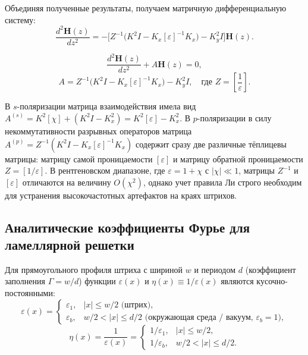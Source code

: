 \documentclass[a4paper,11pt]{article}
\begin{document}
Объединяя полученные результаты, получаем матричную дифференциальную систему:
\begin{equation}
    \frac{d^2 \mathbf{H}(z)}{dz^2} = - \Big[ Z^{-1} \big( K^2 I - K_x [\varepsilon]^{-1} K_x \big) - K_y^2 I \Big] \mathbf{H}(z).
\end{equation}

\begin{mathbox}
\begin{equation}
    \frac{d^2 \mathbf{H}(z)}{dz^2} + A \mathbf{H}(z) = 0,
    \label{eq:matrix_diffeq_p}
\end{equation}
\begin{equation}
    A = Z^{-1} \Big( K^2 I - K_x [\varepsilon]^{-1} K_x \Big) - K_y^2 I, \quad \text{где } Z = \left[ \frac{1}{\varepsilon} \right].
    \label{eq:matrix_A_p_final}
\end{equation}
\end{mathbox}

\begin{remarkbox}
В $s$-поляризации матрица взаимодействия имела вид $A^{(s)} = K^2 [\chi] + (K^2 I - K_x^2) = K^2 [\varepsilon] - K_x^2$. 
В $p$-поляризации в силу некоммутативности разрывных операторов матрица $A^{(p)} = Z^{-1} (K^2 I - K_x [\varepsilon]^{-1} K_x)$ содержит сразу две различные тёплицевы матрицы: матрицу самой проницаемости $[\varepsilon]$ и матрицу обратной проницаемости $Z = [1/\varepsilon]$. 
В рентгеновском диапазоне, где $\varepsilon = 1 + \chi$ с $|\chi| \ll 1$, матрицы $Z^{-1}$ и $[\varepsilon]$ отличаются на величину $O(\chi^2)$, однако учет правила Ли строго необходим для устранения высокочастотных артефактов на краях штрихов.
\end{remarkbox}

\subsection{Аналитические коэффициенты Фурье для ламеллярной решетки}

Для прямоугольного профиля штриха с шириной $w$ и периодом $d$ (коэффициент заполнения $\Gamma = w/d$) функции $\varepsilon(x)$ и $\eta(x) \equiv 1/\varepsilon(x)$ являются кусочно-постоянными:
\begin{equation}
    \varepsilon(x) = \begin{cases}
        \varepsilon_1, & |x| \le w/2 \text{ (штрих)}, \\
        \varepsilon_b, & w/2 < |x| \le d/2 \text{ (окружающая среда / вакуум, $\varepsilon_b = 1$)},
    \end{cases}
\end{equation}
\begin{equation}
    \eta(x) = \frac{1}{\varepsilon(x)} = \begin{cases}
        1/\varepsilon_1, & |x| \le w/2, \\
        1/\varepsilon_b, & w/2 < |x| \le d/2.
    \end{cases}
\end{equation}
\end{document}
